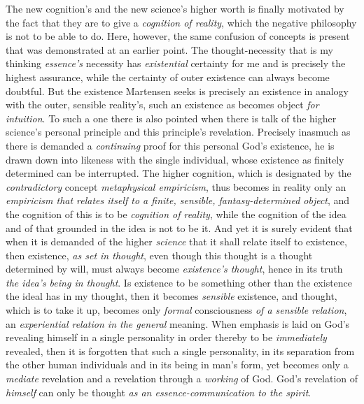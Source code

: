 \documentclass[12pt,a4paper]{book}
\begin{document}
The new cognition's and the new science's higher worth is finally motivated by the fact that they
are to give a \emph{cognition of reality}, which the negative philosophy is not to be able to do.
Here, however, the same confusion of concepts is present that was demonstrated at an earlier
point. The thought-necessity that is my thinking \emph{essence's} necessity has \emph{existential}
certainty for me and is precisely the highest assurance, while the certainty of outer existence
can always become doubtful. But the existence Martensen seeks is precisely an existence in analogy
with the outer, sensible reality's, such an existence as becomes object \emph{for intuition}. To such a
one there is also pointed when there is talk of the higher science's personal principle and this
principle's revelation. Precisely inasmuch as there is demanded a \emph{continuing} proof for this
personal God's existence, he is drawn down into likeness with the single individual, whose
existence as finitely determined can be interrupted. The higher cognition, which is designated by
the \emph{contradictory} concept \emph{metaphysical empiricism}, thus becomes in reality only an
\emph{empiricism that relates itself to a finite, sensible, fantasy-determined object}, and the cognition
of this is to be \emph{cognition of reality}, while the cognition of the idea and of that grounded
in the idea is not to be it. And yet it is surely evident that when it is demanded of the higher
\emph{science} that it shall relate itself to existence, then existence, \emph{as set in thought}, even though
this thought is a thought determined by will, must always become \emph{existence's thought}, hence
in its truth \emph{the idea's being in thought}. Is existence to be something other than the existence
the ideal has in my thought, then it becomes \emph{sensible} existence, and thought, which is to
take it up, becomes only \emph{formal} consciousness \emph{of a sensible relation}, an \emph{experiential relation
in the general} meaning. When emphasis is laid on God's revealing himself in a single personality in
order thereby to be \emph{immediately} revealed, then it is forgotten that such a single personality, in
its separation from the other human individuals and in its being in man's form, yet becomes only a
\emph{mediate} revelation and a revelation through a \emph{working} of God. God's revelation of
\emph{himself} can only be thought \emph{as an essence-communication to the spirit}.
\end{document}
